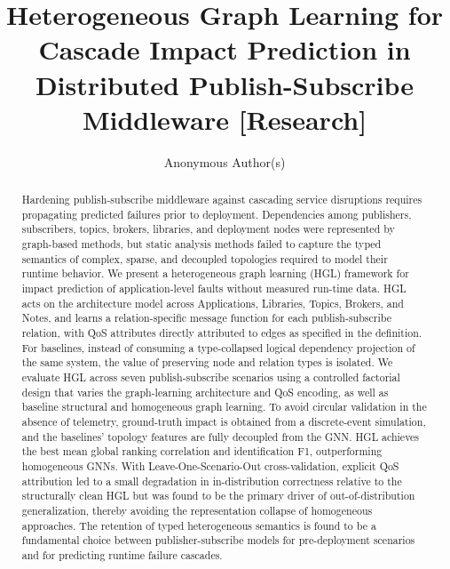 \documentclass[sigconf,9pt,anonymous]{acmart}
\begin{document}
\title{Heterogeneous Graph Learning for Cascade Impact Prediction in Distributed Publish-Subscribe Middleware [Research]}

\author{Anonymous Author(s)}

\begin{abstract}
Hardening publish-subscribe middleware against cascading service disruptions requires propagating predicted failures prior to deployment. Dependencies among publishers, subscribers, topics, brokers, libraries, and deployment nodes were represented by graph-based methods, but static analysis methods failed to capture the typed semantics of complex, sparse, and decoupled topologies required to model their runtime behavior. We present a heterogeneous graph learning (HGL) framework for impact prediction of application-level faults without measured run-time data. HGL acts on the architecture model across Applications, Libraries, Topics, Brokers, and Notes, and learns a relation-specific message function for each publish-subscribe relation, with QoS attributes directly attributed to edges as specified in the definition. For baselines, instead of consuming a type-collapsed logical dependency projection of the same system, the value of preserving node and relation types is isolated. We evaluate HGL across seven publish-subscribe scenarios using a controlled factorial design that varies the graph-learning architecture and QoS encoding, as well as baseline structural and homogeneous graph learning. To avoid circular validation in the absence of telemetry, ground-truth impact is obtained from a discrete-event simulation, and the baselines' topology features are fully decoupled from the GNN. HGL achieves the best mean global ranking correlation and identification F1, outperforming homogeneous GNNs. With Leave-One-Scenario-Out cross-validation, explicit QoS attribution led to a small degradation in in-distribution correctness relative to the structurally clean HGL but was found to be the primary driver of out-of-distribution generalization, thereby avoiding the representation collapse of homogeneous approaches. The retention of typed heterogeneous semantics is found to be a fundamental choice between publisher-subscribe models for pre-deployment scenarios and for predicting runtime failure cascades.
\end{abstract}

\maketitle
\end{document}
